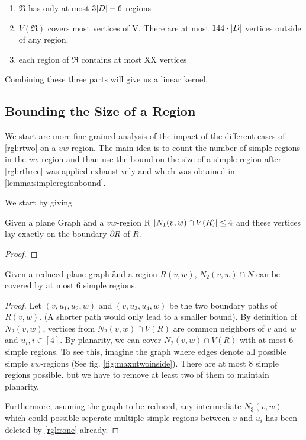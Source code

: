 \begin{enumerate}[topsep=0pt,itemsep=-1ex,partopsep=1ex,parsep=1ex]
    \item $\mathfrak{R}$ has only at most $3 \abs{D} - 6$ regions
    \item $V(\mathfrak{R})$ covers most vertices of V. There are at most $144 \cdot \abs{D}$ vertices outside of any region.
    \item each region of $\mathfrak{R}$ contains at most XX vertices
\end{enumerate}

Combining these three parts will give us a linear kernel.

\subsection{Bounding the Size of a Region}

We start are more fine-grained analysis of the impact of the different cases of \cref{rgl:rtwo} on a $vw$-region. The main idea is to count the number of simple regions in the $vw$-region and than use the bound on the size of a simple region after \cref{rgl:rthree} was applied exhaustively and which was obtained in \cref{lemma:simpleregionbound}.   

We start by giving 

\begin{lemma}\label{lemma:nonecover}
    Given a plane Graph \G and a $vw$-region R $\abs{N_1(v,w) \cap V(R)} \leq 4$ and these vertices lay exactly on the boundary $\partial R$ of $R$. 
\end{lemma}
\begin{proof}

\end{proof}

\begin{lemma}\cite[See Fact 5]{Garnero2018}\label{lemma:ntwocover}
    Given a reduced plane graph \G and a region $R(v,w)$, $N_2(v,w) \cap N$ can be covered by at most 6 simple regions.
\end{lemma}
\begin{proof}
    Let $(v,u_1, u_2,w)$ and $(v, u_3, u_4, w)$ be the two boundary paths of $R(v,w)$. (A shorter path would only lead to a smaller bound).
    By definition of $N_2(v,w)$, vertices from $N_2(v,w) \cap V(R)$ are common neighbors of $v$ and $w$ and $u_i, i \in [4]$. By planarity, we can cover $N_2(v,w) \cap V(R)$ with at most 6 simple regions. To see this, imagine the graph where edges denote all possible simple $vw$-regions (See fig. \ref{fig:maxntwoinside}). There are at most 8 simple regions possible. but we have to remove at least two of them to maintain planarity.
    
    Furthermore, asuming the graph to be reduced, any intermediate $N_3(v,w)$ which could possible seperate multiple simple regions between $v$ and $u_i$ has been deleted by \cref{rgl:rone} already.
\end{proof}

